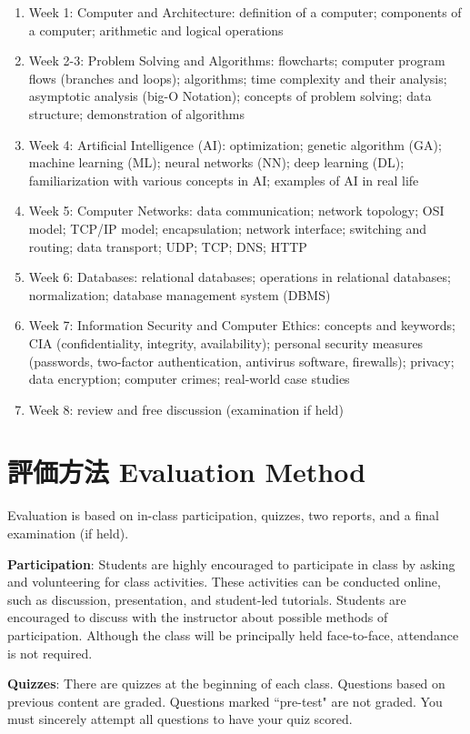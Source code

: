 \documentclass[a4paper]{article}
\begin{document}
\begin{enumerate}
    \item Week 1: Computer and Architecture: definition of a computer; components of a computer; arithmetic and logical operations
    \item Week 2-3: Problem Solving and Algorithms: flowcharts; computer program flows (branches and loops); algorithms; time complexity and their analysis; asymptotic analysis (big-O Notation); concepts of problem solving; data structure; demonstration of algorithms
    \item Week 4: Artificial Intelligence (AI): optimization; genetic algorithm (GA); machine learning (ML); neural networks (NN); deep learning (DL); familiarization with various concepts in AI; examples of AI in real life
    \item Week 5: Computer Networks: data communication; network topology; OSI model; TCP/IP model; encapsulation; network interface; switching and routing; data transport; UDP; TCP; DNS; HTTP
    \item Week 6: Databases: relational databases; operations in relational databases; normalization; database management system (DBMS)
    \item Week 7: Information Security and Computer Ethics: concepts and keywords; CIA (confidentiality, integrity, availability); personal security measures (passwords, two-factor authentication, antivirus software, firewalls); privacy; data encryption; computer crimes; real-world case studies
    \item Week 8: review and free discussion (examination if held)
\end{enumerate}

\section{評価方法 Evaluation Method}
Evaluation is based on in-class participation, quizzes, two reports, and a final examination (if held).

\smallskip\noindent
\textbf{Participation}: Students are highly encouraged to participate in class by asking and volunteering for class activities. These activities can be conducted online, such as discussion, presentation, and student-led tutorials. Students are encouraged to discuss with the instructor about possible methods of participation. Although the class will be principally held face-to-face, attendance is not required.

\smallskip\noindent
\textbf{Quizzes}: There are quizzes at the beginning of each class. Questions based on previous content are graded. Questions marked ``pre-test" are not graded. You must sincerely attempt all questions to have your quiz scored.
\end{document}
